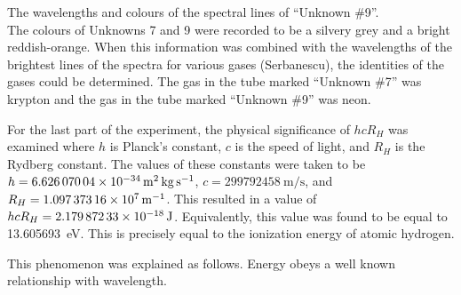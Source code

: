 \begin{paper}
{The wavelengths and colours of the spectral lines of ``Unknown \#9''.}\\

The colours of Unknowns 7 and 9 were recorded to be a silvery grey and a bright reddish-orange.
When this information was combined with the wavelengths of the brightest lines of the spectra for
various gases (Serbanescu), the identities of the gases could be determined.
The gas in the tube marked ``Unknown \#7'' was krypton and the gas in the tube marked ``Unknown \#9'' was neon.

For the last part of the experiment, the physical significance of $hcR_H$ was examined where $h$ is Planck's constant,
$c$ is the speed of light, and $R_H$ is the Rydberg constant.
The values of these constants were taken to be $h=\SI{6.62607004E-34}{\meter\squared\kilo\gram\per\second}$, $c=\SI{299792458}{\meter\per\second}$, and $R_H=\SI{1.09737316E7}{\per\meter}$.
This resulted in a value of $hcR_H=\SI{2.17987233E-18}{\joule}$.
Equivalently, this value was found to be equal to \SI{13.605693}{\electronvolt}.
This is precisely equal to the ionization energy of atomic hydrogen.

This phenomenon was explained as follows.
Energy obeys a well known relationship with wavelength.

\begin{paperwhere}
\end{paperwhere}


\end{paper}
